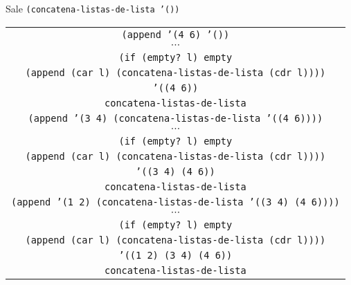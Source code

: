 \documentclass[letterpaper,11pt]{article}
\begin{document}
\begin{enumerate}
\begin{enumerate}
        Sale \texttt{(concatena-listas-de-lista '())}
        \begin{center}
            \begin{tabular}{|c|}
                \hline
                \texttt{(append '(4 6) '())} \\
                $\cdots$ \\
                \texttt{(if (empty? l) empty} \\
                \texttt{(append (car l) (concatena-listas-de-lista (cdr l))))} \\
                \texttt{'((4 6))} \\
                \texttt{concatena-listas-de-lista} \\
                \hline
                \hline
                \texttt{(append '(3 4) 
                (concatena-listas-de-lista '((4 6))))}  \\
                $\cdots$ \\
                \texttt{(if (empty? l) empty} \\
                \texttt{(append (car l) (concatena-listas-de-lista (cdr l))))} \\
                \texttt{'((3 4) (4 6))} \\
                \texttt{concatena-listas-de-lista} \\
                \hline
                \hline
                \texttt{(append '(1 2) 
                (concatena-listas-de-lista '((3 4) (4 6))))}  \\
                $\cdots$ \\
                \texttt{(if (empty? l) empty} \\
                \texttt{(append (car l) (concatena-listas-de-lista (cdr l))))} \\
                \texttt{'((1 2) (3 4) (4 6))} \\
                \texttt{concatena-listas-de-lista} \\
                \hline
            \end{tabular}
        \end{center}


\end{enumerate}
\end{enumerate}
\end{document}
